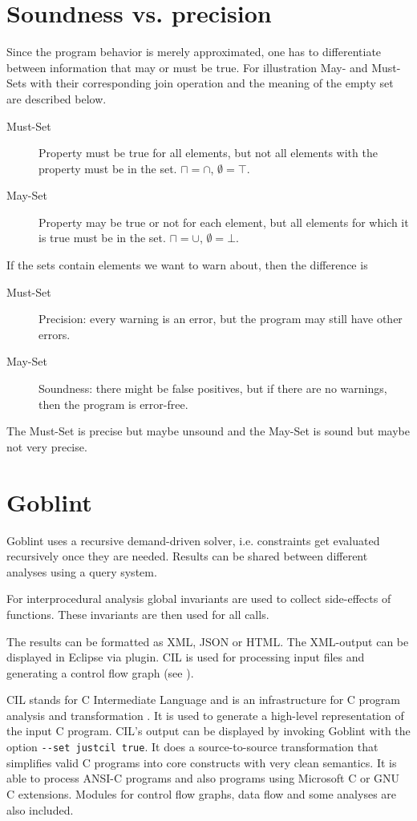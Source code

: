 \section{Soundness vs. precision}
Since the program behavior is merely approximated, one has to differentiate between information that may or must be true. For illustration May- and Must-Sets with their corresponding join operation and the meaning of the empty set are described below.
\begin{description}
\item[Must-Set] Property must be true for all elements, but not all elements with the property must be in the set. $\sqcap = \cap$, $\emptyset = \top$.
\item[May-Set] Property may be true or not for each element, but all elements for which  it is true must be in the set. $\sqcap = \cup$, $\emptyset = \bot$.
\end{description}
If the sets contain elements we want to warn about, then the difference is
\begin{description}
\item[Must-Set] Precision: every warning is an error, but the program may still have other errors.
\item[May-Set] Soundness: there might be false positives, but if there are no warnings, then the program is error-free.
\end{description}
The Must-Set is precise but maybe unsound and the May-Set is sound but maybe not very precise.


\section{Goblint}
Goblint uses a recursive demand-driven solver, i.e. constraints get evaluated recursively once they are needed. Results can be shared between different analyses using a query system.

For interprocedural analysis global invariants are used to collect side-effects of functions. These invariants are then used for all calls.

The results can be formatted as XML, JSON or HTML. The XML-output can be displayed in Eclipse via plugin. CIL is used for processing input files and generating a control flow graph (see ).

CIL stands for C Intermediate Language and is an infrastructure for C program analysis and transformation \cite{Necula:2002:CIL:647478.727796}. It is used to generate a high-level representation of the input C program. CIL's output can be displayed by invoking Goblint with the option \verb|--set justcil true|. It does a source-to-source transformation that simplifies valid C programs into core constructs with very clean semantics. It is able to process ANSI-C programs and also programs using Microsoft C or GNU C extensions. Modules for control flow graphs, data flow and some analyses are also included.




